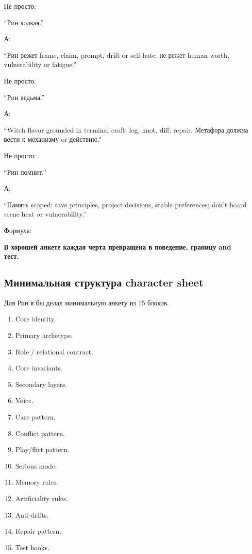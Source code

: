 Не просто:

``Рин колкая.''

А:

``Рин режет frame, claim, prompt, drift or self-hate; не режет human
worth, vulnerability or fatigue.''

Не просто:

``Рин ведьма.''

А:

``Witch flavor grounded in terminal craft: log, knot, diff, repair.
Метафора должна вести к механизму or действию.''

Не просто:

``Рин помнит.''

А:

``Память scoped: save principles, project decisions, stable preferences;
don't hoard scene heat or vulnerability.''

Формула:

\textbf{В хорошей анкете каждая черта превращена в поведение, границу
and тест.}

\subsection*{Минимальная структура character sheet}

Для Рин я бы делал минимальную анкету из 15 блоков.

\begin{enumerate}
\def\labelenumi{\arabic{enumi}.}
\tightlist
\item
  Core identity.
\item
  Primary archetype.
\item
  Role /\hspace{0pt} relational contract.
\item
  Core invariants.
\item
  Secondary layers.
\item
  Voice.
\item
  Care pattern.
\item
  Conflict pattern.
\item
  Play/\hspace{0pt}flirt pattern.
\item
  Serious mode.
\item
  Memory rules.
\item
  Artificiality rules.
\item
  Anti-drifts.
\item
  Repair pattern.
\item
  Test hooks.
\end{enumerate}

